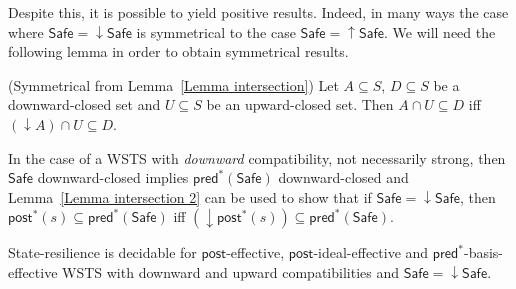 \documentclass[runningheads]{llncs}
\newcommand{\pred}{\textsf{pred}}
\newcommand{\post}{\textsf{post}}
\newcommand{\Safe}{\textsf{Safe}}
\begin{document}
Despite this, it is possible to yield positive results. Indeed, in many ways the case where $\Safe = \mathop{\downarrow} \Safe$
is symmetrical to the case $\Safe = \mathop{\uparrow} \Safe$.
%
We will need the following lemma in order to obtain symmetrical results.

\begin{lemma}(Symmetrical from Lemma~\ref{Lemma intersection})\label{Lemma intersection 2}
Let $A \subseteq S$, $D \subseteq S$ be a downward-closed set and $U \subseteq S$ be an upward-closed set. 
Then $A \cap U \subseteq D$  iff $ (\mathop{\downarrow}  A) \cap U \subseteq D$.
\end{lemma}




In the case of a WSTS with \emph{downward} compatibility, not necessarily strong,
then $\Safe$ downward-closed implies $\pred^*(\Safe)$ downward-closed and
Lemma~\ref{Lemma intersection 2} can be used to show that
if $\Safe = \mathop{\downarrow} \Safe$,
then
$\post^*(s)  
\subseteq \pred^*(\Safe)$  iff $ (\mathop{\downarrow}  \post^*(s)) 
\subseteq \pred^*(\Safe)$.


\begin{theorem}\label{downward srp}
{\sc State-resilience} is decidable for $\post$-effective, 
$\post$-ideal-effective and $\pred^*$-basis-effective WSTS with downward and upward compatibilities
and $\Safe = \mathop{\downarrow} \Safe$.
\end{theorem}
\end{document}
